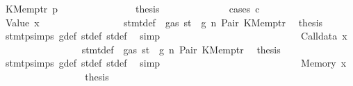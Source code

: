 \begin{isabellebody}
\ {\isacharparenleft}{\kern0pt}KMemptr\ p{\isacharparenright}{\kern0pt}\isanewline
\ \ \ \ \ \ \ \ \ \ \ \ \isamarkupfalse%
\ \isamarkupfalse%
\ {\isacharquery}{\kern0pt}thesis\isanewline
\ \ \ \ \ \ \ \ \ \ \ \ \isamarkupfalse%
\ {\isacharparenleft}{\kern0pt}cases\ c{\isacharparenright}{\kern0pt}\isanewline
\ \ \ \ \ \ \ \ \ \ \ \ \ \ \isamarkupfalse%
\ {\isacharparenleft}{\kern0pt}Value\ x{}{\isacharparenright}{\kern0pt}\isanewline
\ \ \ \ \ \ \ \ \ \ \ \ \ \ \isamarkupfalse%
\ {}{\isacharparenleft}{\kern0pt}{}{\isacharparenright}{\kern0pt}\ stmt{\isacharunderscore}{\kern0pt}def\ {\isacharbackquoteopen}{\isasymnot}\ gas\ st\ {\isasymle}\ g{\isacharbackquoteclose}\ n\ Pair\ KMemptr\ \isamarkupfalse%
\ {\isacharquery}{\kern0pt}thesis\ \isamarkupfalse%
\ stmt{\isachardot}{\kern0pt}psimps{\isacharparenleft}{\kern0pt}{}{\isacharparenright}{\kern0pt}\ g{\isacharunderscore}{\kern0pt}def\ st{\isacharprime}{\kern0pt}{\isacharunderscore}{\kern0pt}def\ st{\isacharprime}{\kern0pt}{\isacharprime}{\kern0pt}{\isacharunderscore}{\kern0pt}def\ \isamarkupfalse%
\ simp\isanewline
\ \ \ \ \ \ \ \ \ \ \ \ \isamarkupfalse%
\isanewline
\ \ \ \ \ \ \ \ \ \ \ \ \ \ \isamarkupfalse%
\ {\isacharparenleft}{\kern0pt}Calldata\ x{}{\isacharparenright}{\kern0pt}\isanewline
\ \ \ \ \ \ \ \ \ \ \ \ \ \ \isamarkupfalse%
\ {}{\isacharparenleft}{\kern0pt}{}{\isacharparenright}{\kern0pt}\ stmt{\isacharunderscore}{\kern0pt}def\ {\isacharbackquoteopen}{\isasymnot}\ gas\ st\ {\isasymle}\ g{\isacharbackquoteclose}\ n\ Pair\ KMemptr\ \isamarkupfalse%
\ {\isacharquery}{\kern0pt}thesis\ \isamarkupfalse%
\ stmt{\isachardot}{\kern0pt}psimps{\isacharparenleft}{\kern0pt}{}{\isacharparenright}{\kern0pt}\ g{\isacharunderscore}{\kern0pt}def\ st{\isacharprime}{\kern0pt}{\isacharunderscore}{\kern0pt}def\ st{\isacharprime}{\kern0pt}{\isacharprime}{\kern0pt}{\isacharunderscore}{\kern0pt}def\ \isamarkupfalse%
\ simp\isanewline
\ \ \ \ \ \ \ \ \ \ \ \ \isamarkupfalse%
\isanewline
\ \ \ \ \ \ \ \ \ \ \ \ \ \ \isamarkupfalse%
\ {\isacharparenleft}{\kern0pt}Memory\ x{}{\isacharparenright}{\kern0pt}\isanewline
\ \ \ \ \ \ \ \ \ \ \ \ \ \ \isamarkupfalse%
\ \isamarkupfalse%
\ {\isacharquery}{\kern0pt}thesis\isanewline

\end{isabellebody}
